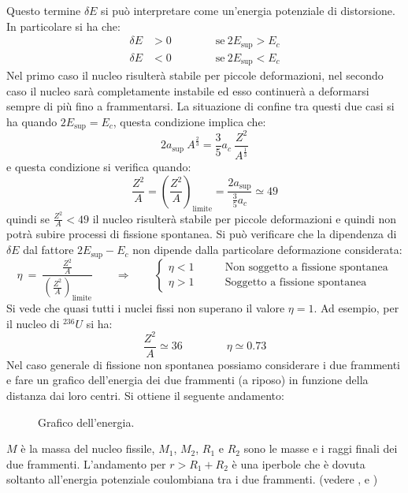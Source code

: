 Questo termine $\delta E$  si può interpretare come un'energia potenziale di
distorsione. In particolare si ha che:
\begin{equation}
\begin{split}
\delta E &> 0 \qquad \qquad \text{se}\ 2 E_\text{sup} > E_c\\
\delta E &< 0 \qquad \qquad \text{se}\ 2 E_\text{sup} < E_c
\end{split}
\end{equation}
Nel primo caso il nucleo risulterà stabile per piccole deformazioni, nel 
secondo
caso il nucleo sarà completamente instabile ed esso continuerà a deformarsi
sempre di più fino a frammentarsi. La situazione di confine tra questi due casi
si ha quando $2E_\text{sup} = E_c$, questa condizione implica che:
\begin{equation}
2a_\text{sup}\ A^{\frac{2}{3}}= \frac{3}{5} a_c\ \frac{Z^2}{A^{\frac{1}{3}}}
\end{equation}
e questa condizione si verifica quando:
\begin{equation}
\frac{Z^2}{A} = \left( \frac{Z^2}{A} \right)_\text{limite} = \frac{2 
a_\text{sup}}{\frac{3}{5}a_c} \simeq 49
\end{equation}
quindi se $\frac{Z^2}{A} < 49$ il nucleo risulterà stabile per piccole
deformazioni e quindi non potrà subire processi di fissione spontanea. Si può
verificare che la dipendenza di $\delta E$ dal fattore $2E_\text{sup} - E_c$ non
dipende dalla particolare deformazione considerata:
\begin{equation}
\eta\ =\ \frac{\frac{Z^2}{A}}{\left( \frac{Z^2}{A} \right)_\text{limite}} 
\qquad \Rightarrow \qquad \begin{cases}
\eta < 1 \qquad &\text{Non soggetto a fissione spontanea}\\
\eta > 1 \qquad &\text{Soggetto a fissione spontanea}
\end{cases}
\end{equation}
Si vede che quasi tutti i nuclei fissi non superano il valore $\eta = 1$.
Ad esempio, per il nucleo di $^{236}U$ si ha:
\begin{equation}
\frac{Z^2}{A} \simeq 36 \qquad \qquad \eta \simeq 0.73
\end{equation}
Nel caso generale di fissione non spontanea possiamo considerare i due frammenti
e fare un grafico dell'energia dei due frammenti (a riposo) in funzione della
distanza dai loro centri. Si ottiene il seguente andamento:
\begin{figure}[hbtp]
\centering
\caption{Grafico dell'energia.}
\label{fig:energy}

\end{figure}
$M$ è la massa del nucleo fissile, $M_1$, $M_2$, $R_1$ e $R_2$ sono le masse e 
i
raggi finali dei due frammenti. L'andamento per $r > R_1 + R_2$ è una iperbole
che è dovuta soltanto all'energia potenziale coulombiana tra i due frammenti.
(vedere \pageref{allegato_3}, \pageref{allegato_41} e \pageref{allegato_42})
